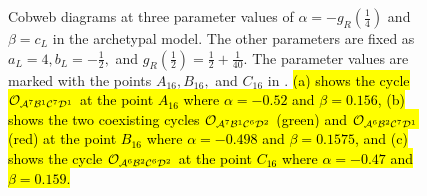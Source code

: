 \begin{figure}
	\centering
	\caption[Cobweb diagrams of the archetypal model]{
		Cobweb diagrams at three parameter values of $\alpha = -g_R\left(\frac{1}{4}\right)$ and $\beta = c_L$ in the archetypal model.
		The other parameters are fixed as $a_L = 4, b_L = -\frac{1}{2},$ and $g_R\left(\frac{1}{2}\right) = \frac{1}{2} + \frac{1}{40}$.
		The parameter values are marked with the points $A_{16}, B_{16},$ and $C_{16}$ in .
		\hl{
			(a) shows the cycle $\mathcal{O}_{\mathcal{A}^7\mathcal{B}^1\mathcal{C}^7\mathcal{D}^1}$ at the point $A_{16}$ where $\alpha = -0.52$ and $\beta = 0.156$,
			(b) shows the two coexisting cycles $\mathcal{O}_{\mathcal{A}^7\mathcal{B}^1\mathcal{C}^6\mathcal{D}^2}$ (green) and $\mathcal{O}_{\mathcal{A}^6\mathcal{B}^2\mathcal{C}^7\mathcal{D}^1}$ (red) at the point $B_{16}$ where $\alpha = -0.498$ and $\beta = 0.1575$,
			and (c) shows the cycle $\mathcal{O}_{\mathcal{A}^6\mathcal{B}^2\mathcal{C}^6\mathcal{D}^2}$ at the point $C_{16}$ where $\alpha = -0.47$ and $\beta = 0.159$.
		}
	}
	\label{fig:arch.dyn.cobwebs.1}
\end{figure}

